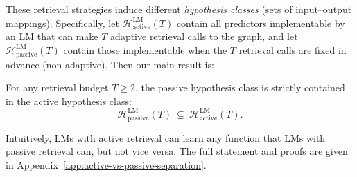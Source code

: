 \documentclass{llmxive}
\begin{document}
These retrieval strategies induce different \emph{hypothesis classes} (sets of input--output mappings). Specifically, let
\(\mathcal{H}^{\mathrm{LM}}_{\mathrm{active}}(T)\) contain all predictors implementable by an LM that can make \(T\)
adaptive retrieval calls to the graph, and let \(\mathcal{H}^{\mathrm{LM}}_{\mathrm{passive}}(T)\) contain those implementable when the \(T\)
retrieval calls are fixed in advance (non-adaptive). Then our main result is:

\begin{theorem}
For any retrieval budget \(T\ge 2\), the passive hypothesis class is strictly contained in the active hypothesis class:
\[
\mathcal{H}^{\mathrm{LM}}_{\mathrm{passive}}(T)\ \subsetneq\ \mathcal{H}^{\mathrm{LM}}_{\mathrm{active}}(T).
\]
\end{theorem}

Intuitively, LMs with active retrieval can learn any function that LMs with passive retrieval can, but not vice versa. The full statement and proofs are given in Appendix~\ref{app:active-vs-passive-separation}.
\end{document}
